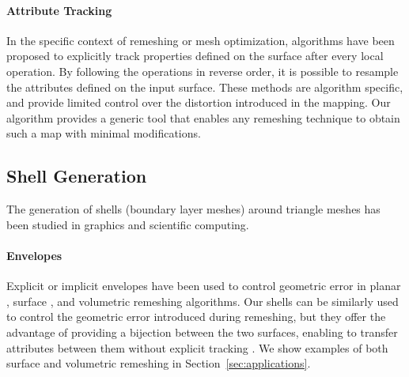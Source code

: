 \paragraph{Attribute Tracking}

In the specific context of remeshing or mesh optimization, algorithms have been proposed to explicitly track properties defined on the surface \cite{garland1997surface,cohen1997simplifying,dunyach2013adaptive} after every local operation. By following the operations in reverse order, it is possible to resample the attributes defined on the input surface. These methods are algorithm specific, and provide limited control over the distortion introduced in the mapping. Our algorithm provides a generic tool that enables any remeshing technique to obtain such a map with minimal modifications.%


\subsection{Shell Generation}
\label{sec:rel:shell}
The generation of shells (boundary layer meshes) around triangle meshes has been studied in graphics and scientific computing.

\paragraph{Envelopes}
Explicit \cite{cohen1996simplification,cohen1997simplifying} or implicit \cite{hu2016error} envelopes have been used to control geometric error in planar \cite{hu2019triwild}, surface {\cite{gueziec1996surface,hu2017, Cheng2019}}, and volumetric \cite{hu2018tetrahedral,Hu:2019:fTetWild} remeshing algorithms. Our shells can be similarly used to control the geometric error introduced during remeshing, but they offer the advantage of providing a bijection between the two surfaces, enabling to transfer attributes between them without explicit tracking \cite{cohen1997simplifying}. We show examples of both surface and volumetric remeshing in Section~\ref{sec:applications}.

